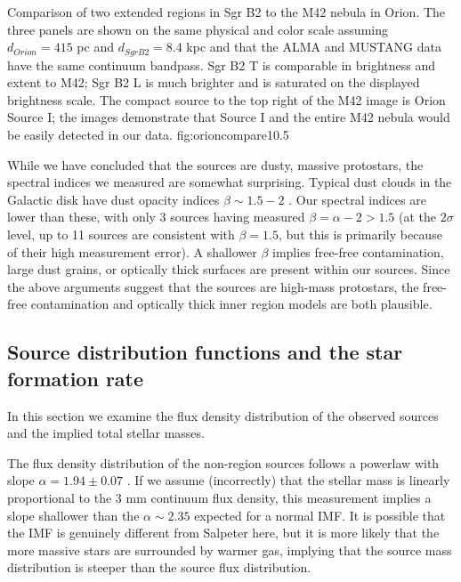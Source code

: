 \documentclass[twocolumn]{aastex61}
\newcommand{\dsgrb}{8.4 kpc\xspace}
\begin{document}
{Comparison of two extended \hii regions in Sgr B2 to the M42 nebula in Orion.
The three panels are shown on the same physical and color scale assuming
$d_{Orion} = 415$ pc and $d_{Sgr B2} = $\dsgrb and that the ALMA and MUSTANG
data have the same continuum bandpass.  Sgr B2 \hii T is comparable in
brightness and extent to M42; Sgr B2 \hii L is much brighter and is saturated
on the displayed brightness scale.  The compact source to the top right of the
M42 image is Orion Source I; the images demonstrate that Source I and the entire
M42 nebula would be easily detected in our data.
}
{fig:orioncompare}{1}{0.5\textwidth}

While we have concluded that the sources are dusty, massive protostars, the
spectral indices we measured are somewhat surprising.  Typical dust clouds in
the Galactic disk have dust opacity indices $\beta\sim1.5-2$
\citep{Schnee2010a,Shirley2011a,Sadavoy2016a}.  Our spectral indices are lower
than these, with only 3 sources having measured $\beta=\alpha-2 > 1.5$ (at the
$2\sigma$ level, up to 11 sources are consistent with $\beta=1.5$, but this is
primarily because of their high measurement error).  A shallower $\beta$
implies free-free contamination, large dust grains, or optically thick surfaces
are present within our sources.  Since the above arguments suggest that the
sources are high-mass protostars, the free-free contamination and optically
thick inner region models are both plausible.

\subsection{Source distribution functions and the star formation rate}
\label{sec:distributionsandsfr}

In this section we examine the flux density distribution of the observed
sources and the implied total stellar masses.  

The flux density distribution of the non-\hii region sources follows a powerlaw
with slope $\alpha=1.94\pm0.07$ \citep[fitted with the MLE method
of][]{Clauset2007a}.  If we assume (incorrectly) that the stellar mass is linearly
proportional to the 3 mm continuum flux density, this measurement implies a
slope shallower than the $\alpha\sim2.35$ expected for a normal IMF.  It is
possible that the IMF is genuinely different from Salpeter here, but it is more
likely that the more massive stars are surrounded by warmer gas, implying that
the source mass distribution is steeper than the source flux distribution.
\end{document}
